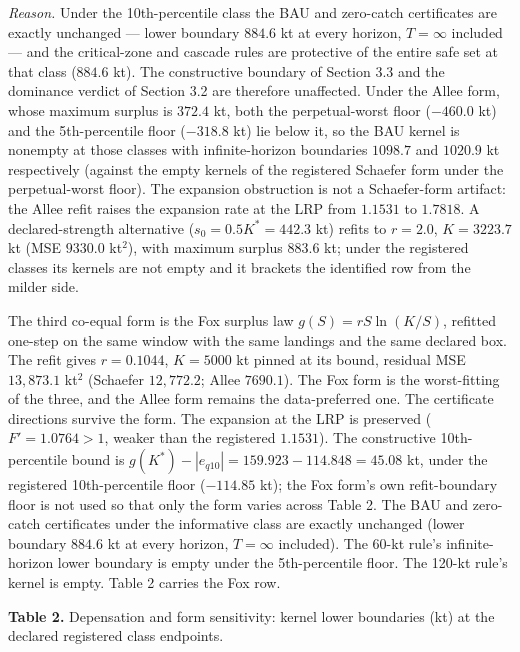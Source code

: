 \documentclass[11pt]{article}
\begin{document}
\emph{Reason.} Under the 10th-percentile class the BAU and zero-catch
certificates are exactly unchanged --- lower boundary \(884.6\) kt at
every horizon, \(T=\infty\) included --- and the critical-zone and
cascade rules are protective of the entire safe set at that class
(\(884.6\) kt). The constructive boundary of Section 3.3 and the
dominance verdict of Section 3.2 are therefore unaffected. Under the
Allee form, whose maximum surplus is \(372.4\) kt, both the
perpetual-worst floor (\(-460.0\) kt) and the 5th-percentile floor
(\(-318.8\) kt) lie below it, so the BAU kernel is nonempty at those
classes with infinite-horizon boundaries \(1098.7\) and \(1020.9\) kt
respectively (against the empty kernels of the registered Schaefer form
under the perpetual-worst floor). The expansion obstruction is not a
Schaefer-form artifact: the Allee refit raises the expansion rate at the
LRP from \(1.1531\) to \(1.7818\). A declared-strength alternative
(\(s_0 = 0.5K^* = 442.3\) kt) refits to \(r = 2.0\), \(K = 3223.7\) kt
(MSE \(9330.0\) kt\(^2\)), with maximum surplus \(883.6\) kt; under the
registered classes its kernels are not empty and it brackets the
identified row from the milder side.

The third co-equal form is the Fox surplus law \(g(S) = rS\ln(K/S)\),
refitted one-step on the same window with the same landings and the same
declared box. The refit gives \(r = 0.1044\), \(K = 5000\) kt pinned at
its bound, residual MSE \(13{,}873.1\) kt\(^2\) (Schaefer
\(12{,}772.2\); Allee \(7690.1\)). The Fox form is the worst-fitting of
the three, and the Allee form remains the data-preferred one. The
certificate directions survive the form. The expansion at the LRP is
preserved (\(F' = 1.0764 > 1\), weaker than the registered \(1.1531\)).
The constructive 10th-percentile bound is
\(g(K^*) - |e_{q10}| = 159.923 - 114.848 = 45.08\) kt, under the
registered 10th-percentile floor (\(-114.85\) kt); the Fox form's own
refit-boundary floor is not used so that only the form varies across
Table 2. The BAU and zero-catch certificates under the informative class
are exactly unchanged (lower boundary \(884.6\) kt at every horizon,
\(T=\infty\) included). The 60-kt rule's infinite-horizon lower boundary
is empty under the 5th-percentile floor. The 120-kt rule's kernel is
empty. Table 2 carries the Fox row.

\textbf{Table 2.} Depensation and form sensitivity: kernel lower
boundaries (kt) at the declared registered class endpoints.
\end{document}
